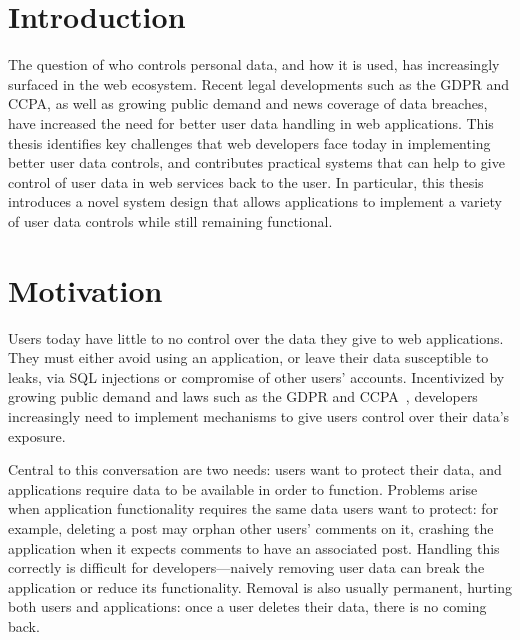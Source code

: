 \section{Introduction}
The question of who controls personal data, and how it is used, has increasingly
surfaced in the web ecosystem. 
%
Recent legal developments such as the GDPR and CCPA, as well as growing public
demand and news coverage of \eg data breaches, have increased the need for
better user data handling in web applications. 
%
%
This thesis identifies key challenges that web developers face today in
implementing better user data controls, and contributes practical systems that
can help to give control of user data in web services back to the user.
%
In particular, this thesis introduces a novel system design that allows
applications to implement a variety of user data controls while still remaining
functional.

\section{Motivation}
\label{sec:intro:motivation}
Users today have little to no control over the data they give to web
applications.  They must either avoid using an application, or leave their data
susceptible to leaks, \eg via SQL injections or compromise of other users'
accounts.  Incentivized by growing public demand and laws such as the GDPR and
CCPA~\cite{eu:gdpr, ccpa}, developers increasingly need to implement mechanisms
to give users control over their data’s exposure.

Central to this conversation are two needs: users want to protect their data,
and applications require data to be available in order to function. Problems
arise when application functionality requires the same data users want to
protect: for example, deleting a post may orphan other users' comments on it,
crashing the application when it expects comments to have an associated post.
Handling this correctly is difficult for developers---naively removing user data
can break the application or reduce its functionality. Removal is also usually
permanent, hurting both users and applications: once a user deletes their data,
there is no coming back.

